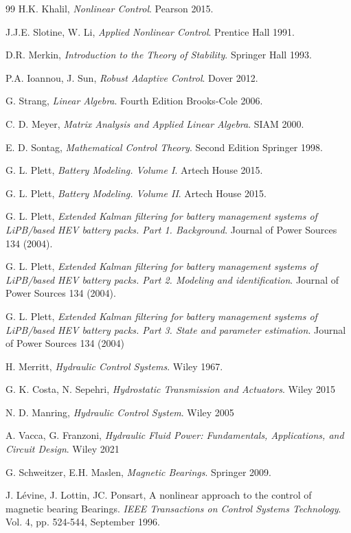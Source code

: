 \documentclass[12pt,a4paper,oneside]{book}
\begin{document}
\begin{thebibliography}{99}
	H.K. Khalil, \emph{Nonlinear Control}. Pearson 2015.
	
	J.J.E. Slotine, W. Li,  \emph{Applied Nonlinear Control}. Prentice Hall 1991.

	D.R. Merkin,  \emph{Introduction to the Theory of Stability}. Springer Hall 1993.
	
	P.A. Ioannou, J. Sun,  \emph{Robust Adaptive Control}. Dover 2012.
	
	G. Strang,  \emph{Linear Algebra}. Fourth Edition Brooks-Cole 2006.
	
	C. D. Meyer, \emph{Matrix Analysis and Applied Linear Algebra}. SIAM 2000.
	
	E. D. Sontag,  \emph{Mathematical Control Theory}.  Second Edition Springer 1998.
	
	G. L. Plett,  \emph{Battery Modeling. Volume I}. Artech House 2015.
	
	G. L. Plett,  \emph{Battery Modeling. Volume II}. Artech House 2015.
	
	G. L. Plett,  \emph{Extended Kalman filtering for battery management systems of LiPB/based HEV battery packs. Part 1. Background}. Journal of Power Sources 134 (2004).
	
	G. L. Plett,  \emph{Extended Kalman filtering for battery management systems of LiPB/based HEV battery packs. Part 2. Modeling and identification}. Journal of Power Sources 134 (2004).	
	
	G. L. Plett,  \emph{Extended Kalman filtering for battery management systems of LiPB/based HEV battery packs. Part 3. State and parameter estimation}. Journal of Power Sources 134 (2004)	
	
	H. Merritt,  \emph{Hydraulic Control Systems}. Wiley 1967.
	
	G. K. Costa, N. Sepehri,  \emph{Hydrostatic Transmission and Actuators}. Wiley 2015
	
	N. D. Manring,  \emph{Hydraulic Control System}. Wiley 2005

	A. Vacca, G. Franzoni, \emph{Hydraulic Fluid Power: Fundamentals, Applications, and Circuit Design}. Wiley 2021

	G. Schweitzer, E.H. Maslen, \emph{Magnetic Bearings}. Springer 2009.
	
	J. Lévine, J. Lottin, JC. Ponsart, {A nonlinear approach to the control of magnetic bearing Bearings}. \emph{IEEE Transactions on Control Systems Technology}. Vol. 4, pp. 524-544, September 1996.
	
\end{thebibliography}


\end{document}
